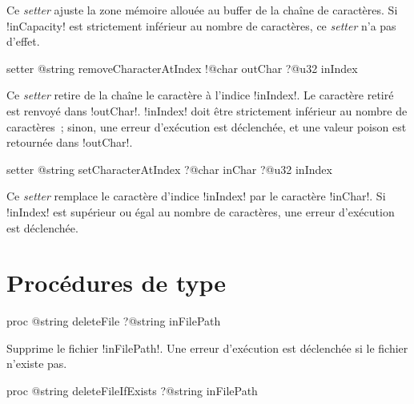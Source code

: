 Ce \emph{setter} ajuste la zone mémoire allouée au buffer de la chaîne de caractères. Si \ggsq!inCapacity! est strictement inférieur au nombre de caractères, ce \emph{setter} n'a pas d'effet.







\begin{galgas4box}
setter @string removeCharacterAtIndex
   !@char outChar
   ?@u32 inIndex
\end{galgas4box}


Ce \emph{setter} retire de la chaîne le caractère à l'indice \ggsq!inIndex!. Le caractère retiré est renvoyé dans \ggsq!outChar!. \ggsq!inIndex! doit être strictement inférieur au nombre de caractères~; sinon, une erreur d'exécution est déclenchée, et une valeur poison est retournée dans \ggsq!outChar!.







\begin{galgas4box}
setter @string setCharacterAtIndex
   ?@char inChar
   ?@u32 inIndex
\end{galgas4box}


Ce \emph{setter} remplace le caractère d'indice \ggsq!inIndex! par le caractère \ggsq!inChar!. Si \ggsq!inIndex! est supérieur ou égal au nombre de caractères, une erreur d'exécution est déclenchée.




\section{Procédures de type}




\begin{galgas4box}
proc @string deleteFile ?@string inFilePath
\end{galgas4box}

Supprime le fichier \ggsq!inFilePath!. Une erreur d'exécution est déclenchée si le fichier n'existe pas.






\begin{galgas4box}
proc @string deleteFileIfExists ?@string inFilePath
\end{galgas4box}

